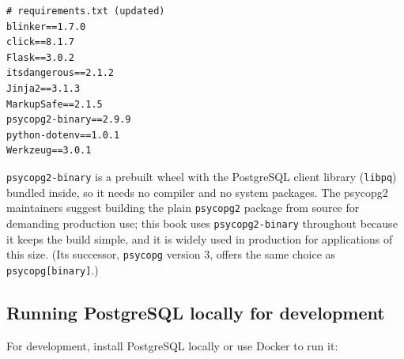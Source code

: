 \begin{outputbox}[short]
\begin{Verbatim}[fontsize=\codesize, breaklines, breakanywhere, breaksymbolleft={\tiny\textcolor{muted}{$\hookrightarrow$}}]
# requirements.txt (updated)
blinker==1.7.0
click==8.1.7
Flask==3.0.2
itsdangerous==2.1.2
Jinja2==3.1.3
MarkupSafe==2.1.5
psycopg2-binary==2.9.9
python-dotenv==1.0.1
Werkzeug==3.0.1
\end{Verbatim}
\end{outputbox}

\begin{codebox}[short]

\begin{Shaded}
\begin{Highlighting}[]
\OperatorTok{\textgreater{}}
\end{Highlighting}
\end{Shaded}

\end{codebox}

\noindent{}\texttt{psycopg2-binary} is a prebuilt wheel with the PostgreSQL client library (\texttt{libpq}) bundled inside, so it needs no compiler and no system packages. The psycopg2 maintainers suggest building the plain \texttt{psycopg2} package from source for demanding production use; this book uses \texttt{psycopg2-binary} throughout because it keeps the build simple, and it is widely used in production for applications of this size. (Its successor, \texttt{psycopg} version 3, offers the same choice as \texttt{psycopg{[}binary{]}}.)

\subsection*{Running PostgreSQL locally for development}\label{13-configuration-externalization:running-postgresql-locally-for-development}

For development, install PostgreSQL locally or use Docker to run it:

\begin{codebox}[short]

\begin{Shaded}
\begin{Highlighting}[]
\DataTypeTok{\textbackslash{}}
  \DataTypeTok{\textbackslash{}}
  \DataTypeTok{\textbackslash{}}
  \DataTypeTok{\textbackslash{}}
  \DataTypeTok{\textbackslash{}}
\end{Highlighting}
\end{Shaded}

\end{codebox}

